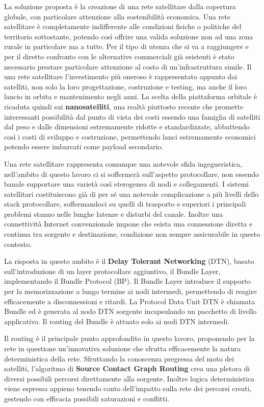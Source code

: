 \documentclass[12pt,a4paper,oneside]{book}
\begin{document}
	La soluzione proposta è la creazione di una rete satellitare dalla copertura globale, con particolare attenzione alla sostenibilità economica. Una rete satellitare è completamente indifferente alle condizioni fisiche o politiche del territorio sottostante, potendo così offrire una valida soluzione non ad una zona rurale in particolare ma a tutte. Per il tipo di utenza che si va a raggiungere e per il diretto confronto con le alternative commerciali già esistenti è stato necessario prestare particolare attenzione al costo di un'infrastruttura simile. Il una rete satellitare l'investimento più oneroso è rappresentato appunto dai satelliti, non solo la loro progettazione, costruzione e testing, ma anche il loro lancio in orbita e mantenimento negli anni. La scelta della piattaforma orbitale è ricaduta quindi sui \textbf{nanosatelliti}, una realtà piuttosto recente che promette interessanti possibilità dal punto di vista dei costi essendo una famiglia di satelliti dal peso e dalle dimensioni estremamente ridotte e standardizzate, abbattendo così i costi di sviluppo e costruzione, permettendo lanci estremamente economici potendo essere imbarcati come payload secondario. 
	
	Una rete satellitare rappresenta comunque una notevole sfida ingegneristica, nell'ambito di questo lavoro ci si soffermerà sull'aspetto protocollare, non essendo banale supportare una varietà così eterogenea di nodi e collegamenti. I sistemi satellitari costituiscono già di per sé una notevole complicazione a più livelli dello stack protocollare, soffermandoci su quelli di trasporto e superiori i principali problemi stanno nelle lunghe latenze e disturbi del canale. Inoltre una connettività Internet convenzionale impone che esista una connessione diretta e continua tra sorgente e destinazione, condizione non sempre assicurabile in questo contesto. 
	
	La risposta in questo ambito è il \textbf{Delay Tolerant Networking} (DTN), basato sull'introduzione di un layer protocollare aggiuntivo, il Bundle Layer, implementando il Bundle Protocol (BP). Il Bundle Layer introduce il supporto per la memorizzazione a lungo termine ai nodi intermedi, permettendo di reagire efficacemente a disconnessioni e ritardi. La Protocol Data Unit DTN è chiamata Bundle ed è generata al nodo DTN sorgente incapsulando un pacchetto di livello applicativo. Il routing del Bundle è attuato solo ai nodi DTN intermedi. 	
	
	Il routing è il principale punto approfondito in questo lavoro, proponendo per la rete in questione un'innovativa soluzione che sfrutta efficacemente la natura deterministica della rete. Sfruttando la conoscenza pregressa del moto dei satelliti, l'algoritmo di \textbf{Source Contact Graph Routing} crea una pletora di diversi possibili percorsi direttamente alla sorgente. Inoltre logica deterministica viene espressa appieno tenendo conto dell'impatto sulla rete dei percorsi creati, gestendo con efficacia possibili saturazioni e conflitti. 
	
\end{document}
